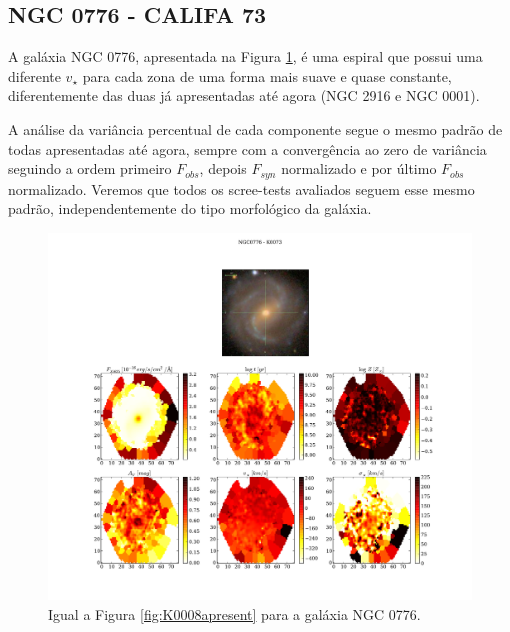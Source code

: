 \subsection{NGC 0776 - CALIFA 73}

A galáxia NGC 0776, apresentada na Figura \ref{fig:K0073apresent}, é uma espiral que possui uma diferente $v_\star$ para
cada zona de uma forma mais suave e quase constante, diferentemente das duas já apresentadas até agora (NGC 2916 e NGC
0001).

A análise da variância percentual de cada componente segue o mesmo padrão de todas apresentadas até agora, sempre com a
convergência ao zero de variância seguindo a ordem primeiro $F_{obs}$, depois $F_{syn}$ normalizado e por último
$F_{obs}$ normalizado. Veremos que todos os scree-tests avaliados seguem esse mesmo padrão, independentemente do tipo
morfológico da galáxia.

\begin{figure}
    \includegraphics[width=1.\textwidth]{figuras/K0073-apresent.pdf}
    \caption[Propriedades f\'isicas da gal\'axia NGC 0776.]
    {Igual a Figura \ref{fig:K0008apresent} para a galáxia NGC 0776.}
    \label{fig:K0073apresent}
\end{figure}

